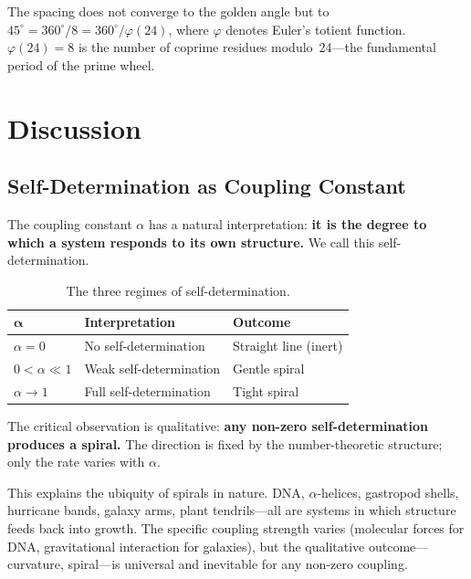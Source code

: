 \documentclass[11pt,a4paper]{article}
\begin{document}
The spacing does not converge to the golden angle but to $45^\circ = 360^\circ/8 = 360^\circ/\varphi(24)$, where $\varphi$ denotes Euler's totient function. $\varphi(24) = 8$ is the number of coprime residues modulo~24---the fundamental period of the prime wheel.

\section{Discussion}

\subsection{Self-Determination as Coupling Constant}

The coupling constant $\alpha$ has a natural interpretation: \textbf{it is the degree to which a system responds to its own structure.} We call this self-determination.

\begin{table}[H]
\centering
\begin{tabular}{lll}
\toprule
$\boldsymbol{\alpha}$ & \textbf{Interpretation} & \textbf{Outcome} \\
\midrule
$\alpha = 0$ & No self-determination & Straight line (inert) \\
$0 < \alpha \ll 1$ & Weak self-determination & Gentle spiral \\
$\alpha \to 1$ & Full self-determination & Tight spiral \\
\bottomrule
\end{tabular}
\caption{The three regimes of self-determination.}
\label{tab:selfd}
\end{table}

The critical observation is qualitative: \textbf{any non-zero self-determination produces a spiral.} The direction is fixed by the number-theoretic structure; only the rate varies with $\alpha$.

This explains the ubiquity of spirals in nature. DNA, $\alpha$-helices, gastropod shells, hurricane bands, galaxy arms, plant tendrils---all are systems in which structure feeds back into growth. The specific coupling strength varies (molecular forces for DNA, gravitational interaction for galaxies), but the qualitative outcome---curvature, spiral---is universal and inevitable for any non-zero coupling.
\end{document}
